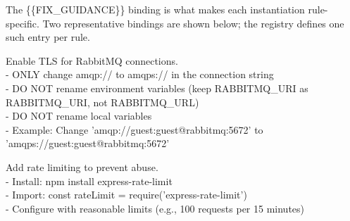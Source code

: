 \documentclass[preprint,12pt]{elsarticle}
\newcommand{\new}[1]{#1}
\begin{document}
\new{The \{\{FIX\_GUIDANCE\}\} binding is what makes each instantiation
rule-specific. Two representative bindings are shown below; the registry
defines one such entry per rule.}

\begin{tcolorbox}[
    colback=gray!5!white,
    colframe=gray!75!black,
    title=\{\{FIX\_GUIDANCE\}\} bound for RULE\_ID = PLAINTEXT\_BROKER,
    fonttitle=\bfseries
]
\small\ttfamily
Enable TLS for RabbitMQ connections.\\
- ONLY change amqp:// to amqps:// in the connection string\\
- DO NOT rename environment variables (keep RABBITMQ\_URI as\\
\hspace*{1em}RABBITMQ\_URI, not RABBITMQ\_URL)\\
- DO NOT rename local variables\\
- Example: Change 'amqp://guest:guest@rabbitmq:5672' to\\
\hspace*{1em}'amqps://guest:guest@rabbitmq:5672'
\end{tcolorbox}

\begin{tcolorbox}[
    colback=gray!5!white,
    colframe=gray!75!black,
    title=\{\{FIX\_GUIDANCE\}\} bound for RULE\_ID = MISSING\_RATE\_LIMITING,
    fonttitle=\bfseries
]
\small\ttfamily
Add rate limiting to prevent abuse.\\
- Install: npm install express-rate-limit\\
- Import: const rateLimit = require('express-rate-limit')\\
- Configure with reasonable limits (e.g., 100 requests per 15 minutes)
\end{tcolorbox}
\end{document}
